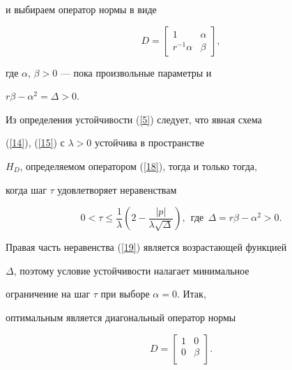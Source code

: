и выбираем оператор нормы в виде


\begin{equation}\label{18}


D=\begin{bmatrix}


1&\alpha \\ r^{-1}\alpha &\beta


\end{bmatrix}


,


\end{equation}


где $\alpha$, $\beta >0$ --- пока произвольные параметры и


$r\beta -\alpha^2=\Delta>0$.





Из определения устойчивости (\ref{5}) следует, что явная схема


(\ref{14}), (\ref{15}) с $\lambda >0$ устойчива в пространстве


$H_{D}$, определяемом оператором (\ref{18}), тогда и только тогда,


когда шаг $\tau$ удовлетворяет неравенствам


\begin{equation}\label{19}


0 < \tau \leqslant \frac{1} {\lambda}\left({2-\frac{{| p


|}} {{\lambda \sqrt \Delta}}} \right),\ \ \text{где}


\ \ \Delta=r\beta-\alpha ^2 >0.


\end{equation}





Правая часть неравенства (\ref{19}) является возрастающей функцией


$\Delta$, поэтому условие устойчивости налагает минимальное


ограничение на шаг $\tau$ при выборе $\alpha=0$. Итак,


оптимальным является диагональный оператор нормы


\begin{equation}\label{20}


D=\begin{bmatrix}


1 & 0 \\


0 & \beta \\


\end{bmatrix}.


\end{equation}



